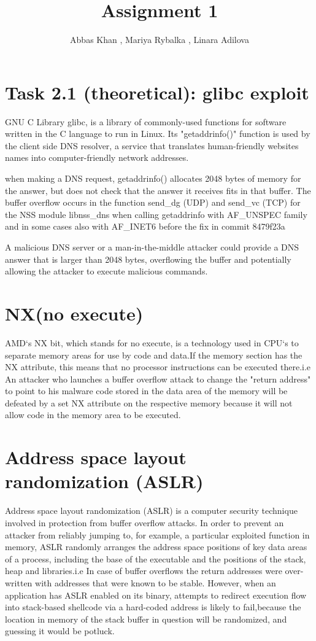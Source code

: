 \documentclass{article}
\title{Assignment 1}
\author{Abbas Khan , Mariya Rybalka , Linara Adilova}
\begin{document}
    \maketitle 
    \newpage
         \section*{Task 2.1 (theoretical): glibc exploit}
    GNU C Library glibc, is a library of commonly-used functions for software written in the C language to run in Linux. Its "getaddrinfo()" function is used by the client side DNS resolver, a service that translates human-friendly websites names into computer-friendly network addresses.

when making a DNS request, getaddrinfo() allocates 2048 bytes of memory for the answer, but does not check that the answer it receives fits in that buffer. The buffer overflow occurs in the function send{\_}dg (UDP) and send{\_}vc (TCP) for the NSS module libnss{\_}dns when calling getaddrinfo with AF{\_}UNSPEC family and in some cases also with AF{\_}INET6 before the fix in
commit 8479f23a

A malicious DNS server or a man-in-the-middle attacker could provide a DNS answer that is larger than 2048 bytes, overflowing the buffer and potentially allowing the attacker to execute malicious commands.
	  \section*{NX(no execute)}
AMD`s NX bit, which stands for no execute, is a technology used in CPU`s to separate memory areas
for use by code and data.If the memory section has the NX attribute, this means that no processor instructions can be executed there.i.e An attacker who launches a buffer overflow attack to change
the "return address" to point to his malware code stored in the data area of the memory will be 
defeated by a set NX attribute on the respective memory because it will not allow code in the
memory area to be executed. 
	 \section*{Address space layout randomization (ASLR)}
Address space layout randomization (ASLR) is a computer security technique involved in protection from buffer overflow attacks. In order to prevent an attacker from reliably jumping to, for example, a particular exploited function in memory, ASLR randomly arranges the address space positions of key data areas of a process, including the base of the executable and the positions of the stack, heap and libraries.i.e In case of buffer overflows the return addresses were over-
written with addresses that were known to be stable.
However, when an application has ASLR enabled on its binary, attempts to redirect execution flow
into stack-based shellcode via a hard-coded address is likely to fail,because the location in 
memory of the stack buffer in question will be randomized, and guessing it would be potluck.
\end{document}
